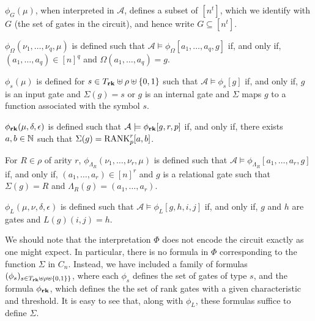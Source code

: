 \documentclass[../paper.tex]{subfiles}
\begin{document}
\begin{myitemize}
\item $\phi_G(\mu)$, when interpreted in $\mathcal{A}$, defines a subset of
  $[n^t]$, which we identify with $G$ (the set of gates in the circuit), and
  hence write $G \subseteq [n^t]$.
\item $\phi_{\Omega}(\nu_1, \ldots , \nu_q, \mu)$ is defined such that
  $\mathcal{A} \models \phi_\Omega[a_1, \ldots, a_q, g]$ if, and only if, $(a_1,
  \ldots, a_q) \in [n]^q$ and $\Omega(a_1, \ldots, a_q) = g$.
\item $\phi_s (\mu)$ is defined for $s \in T_{\text{\textbf{rk}}} \uplus \rho \uplus \{0,1\}$
  such that $\mathcal{A} \models \phi_s [g]$ if, and only if, $g$ is an input
  gate and $\Sigma (g) = s$ or $g$ is an internal gate and $\Sigma$ maps $g$ to
  a function associated with the symbol $s$.
\item $\phi_{\text{\textbf{rk}}}(\mu, \delta, \epsilon)$ is defined such that $\mathcal{A}
  \models \phi_{\text{\textbf{rk}}}[g,r,p]$ if, and only if, there exists $a, b \in \mathbb{N}$
  such that $\Sigma (g) = \text{\upshape RANK}^r_p[a,b]$.
\item For $R \in \rho$ of arity $r$, $\phi_{\Lambda_R}(\nu_1, \ldots, \nu_r,
  \mu)$ is defined such that $\mathcal{A} \models \phi_{\Lambda_R} [a_1, \ldots,
  a_r, g]$ if, and only if, $(a_1, \ldots, a_r)\in [n]^r$ and $g$ is a
  relational gate such that $\Sigma (g) = R$ and $\Lambda_R (g) = (a_1, \ldots,
  a_r)$.
\item $\phi_L(\mu, \nu, \delta, \epsilon)$ is defined such that $\mathcal{A}
  \models \phi_L[g,h,i,j]$ if, and only if, $g$ and $h$ are gates and $L(g)(i,j)
  = h$.
\end{myitemize}

We should note that the interpretation $\Phi$ does not encode the circuit
exactly as one might expect. In particular, there is no formula in $\Phi$
corresponding to the function $\Sigma$ in $C_n$. Instead, we have included a
family of formulas $(\phi_s)_{s \in T_{\text{\textbf{rk}}} \uplus \rho \uplus \{0,1\}\}}$,
where each $\phi_s$ defines the set of gates of type $s$, and the formula
$\phi_{\text{\textbf{rk}}}$, which defines the the set of rank gates with a given
characteristic and threshold. It is easy to see that, along with $\phi_L$, these
formulas suffice to define $\Sigma$.
  
\end{document}
